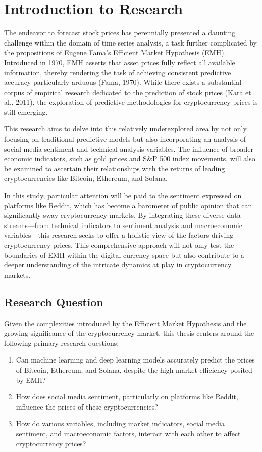 \section{Introduction to Research}
The endeavor to forecast stock prices has perennially presented a daunting challenge within the domain of time series analysis, 
a task further complicated by the propositions of Eugene Fama’s Efficient Market Hypothesis (EMH). Introduced in 1970, 
EMH asserts that asset prices fully reflect all available information, thereby rendering the task of achieving consistent 
predictive accuracy particularly arduous (Fama, 1970). While there exists a substantial corpus of empirical research dedicated to 
the prediction of stock prices (Kara et al., 2011), the exploration of predictive methodologies for cryptocurrency prices is still emerging.

This research aims to delve into this relatively underexplored area by not only focusing on traditional predictive models but also
incorporating an analysis of social media sentiment and technical analysis variables. The influence of broader economic indicators, 
such as gold prices and S\&P 500 index movements, will also be examined to ascertain their relationships with the returns of leading 
cryptocurrencies like Bitcoin, Ethereum, and Solana.

In this study, particular attention will be paid to the sentiment expressed on platforms like Reddit, which has become a barometer of 
public opinion that can significantly sway cryptocurrency markets. By integrating these diverse data streams—from technical indicators 
to sentiment analysis and macroeconomic variables—this research seeks to offer a holistic view 
of the factors driving cryptocurrency prices. This comprehensive approach will not only test the boundaries of EMH within the digital currency 
space but also contribute to a deeper understanding of the intricate dynamics at play in cryptocurrency markets.

\subsection{Research Question}
Given the complexities introduced by the Efficient Market Hypothesis and the growing significance of the cryptocurrency market,
this thesis centers around the following primary research questions:

\begin{enumerate}
\item Can machine learning and deep learning models accurately predict the prices of Bitcoin, Ethereum, and Solana, despite the high market 
efficiency posited by EMH?

\item How does social media sentiment, particularly on platforms like Reddit, influence the prices of these cryptocurrencies?

\item How do various variables, including market indicators, social media sentiment, and macroeconomic factors, interact with each other to affect cryptocurrency prices?
\end{enumerate}

